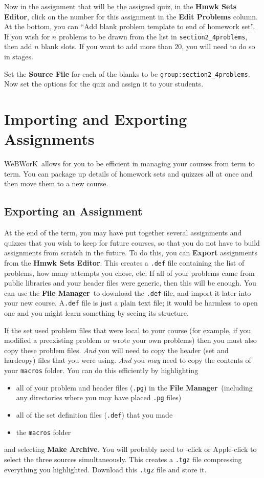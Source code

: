 \documentclass[12pt]{article}
\newcommand{\menu}[1]{\textbf{#1}}
\newcommand{\WW}{WeBWorK}
\newcommand{\HSE}{\menu{Hmwk Sets Editor}}
\newcommand{\FM}{\menu{File Manager}}
\begin{document}
Now in the assignment that will be the assigned quiz, in the \HSE, click on the number for this assignment in the {\bf Edit Problems} column.
At the bottom, you can ``Add blank problem template to end of homework set''.
If you wish for $n$ problems to be drawn from the list in \texttt{section2\_4problems}, then add $n$ blank slots.
If you want to add more than $20$, you will need to do so in stages.

Set the {\bf Source File} for each of the blanks to be \texttt{group:section2\_4problems}.
Now set the options for the quiz and assign it to your students.

\section{Importing and Exporting Assignments}\label{impexp}
\WW\ allows for you to be efficient in managing your courses from term to term.
You can package up details of homework sets and quizzes all at once and then move them to a new course.

\subsection{Exporting an Assignment}\label{exp}
At the end of the term, you may have put together several assignments and quizzes that you wish to keep for future courses, so that you do not have to build assignments from scratch in the future.
To do this, you can \menu{Export} assignments from the \HSE.
This creates a \texttt{.def} file containing the list of problems, how many attempts you chose, etc.  If all of your problems came from public libraries and your header files were generic, then this will be enough.
You can use the \FM\  to download the \texttt{.def} file, and import it later into your new course.
A\texttt{.def} file is just a plain text file; it would be harmless to open one and you might learn something by seeing its structure.

If the set used problem files that were local to your course (for example, if you modified a preexisting problem or wrote your own problems) then you must also copy these problem files.
\emph{And} you will need to copy the header (set and hardcopy) files that you were using.  \emph{And} you \emph{may} need to copy the contents of your \texttt{macros} folder.
You can do this efficiently by highlighting \begin{itemize}
	\item all of your problem and header files (\texttt{.pg}) in the \FM\  (including any directories where you may have placed \texttt{.pg} files)
	\item all of the set definition files (\texttt{.def}) that you made
	\item the \texttt{macros} folder \end{itemize} and selecting \menu{Make Archive}.
You will probably need to \Ctrl-click or Apple-click to select the three sources simultaneously.
This creates a \texttt{.tgz} file compressing everything you highlighted.
Download this \texttt{.tgz} file and store it.
\end{document}
